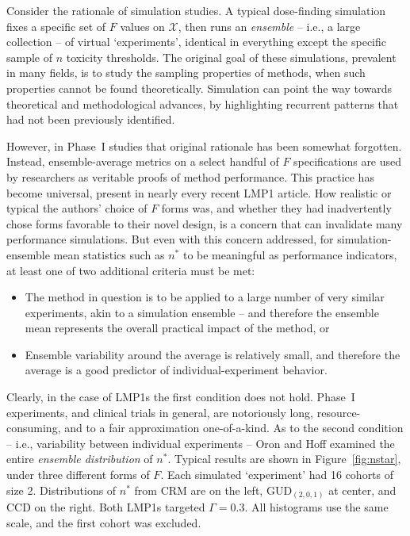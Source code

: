 Consider the rationale of simulation studies. A typical dose-finding simulation fixes a specific set of $F$ values on $\mathcal{X}$, then runs an \emph{ensemble} -- i.e., a large collection -- of virtual `experiments', identical in everything except the specific sample of $n$ toxicity thresholds. The original goal of these simulations, prevalent in many fields, is to study the sampling properties of methods, when such properties cannot be found theoretically. Simulation can point the way towards theoretical and methodological advances, by highlighting recurrent patterns that had not been previously identified.

However, in Phase~I studies that original rationale has been somewhat forgotten. Instead, ensemble-average metrics on a select handful of $F$ specifications are used by researchers as veritable proofs of method performance. This practice has become universal, present in nearly every recent LMP1 article. How realistic or typical the authors' choice of $F$ forms was, and whether they had inadvertently chose forms favorable to their novel design, is a concern that can invalidate many performance simulations. But even with this concern addressed, for simulation-ensemble mean statistics such as $n^*$ to be meaningful as performance indicators, at least one of two additional criteria must be met:
\begin{itemize}
\item The method in question is to be applied to a large number of very similar experiments, akin to a simulation ensemble -- and therefore the ensemble mean represents the overall practical impact of the method, or
\item Ensemble variability around the average is relatively small, and therefore the average is a good predictor of individual-experiment behavior.
\end{itemize}

Clearly, in the case of LMP1s the first condition does not hold. Phase~I experiments, and clinical trials in general, are notoriously long, resource-consuming, and to a fair approximation one-of-a-kind. As to the second condition -- i.e., variability between individual experiments -- Oron and Hoff \citep{Oron:Hoff:smal:2013} examined the entire \emph{ensemble distribution} of $n^*$. Typical results are shown in Figure~\ref{fig:nstar}, under three different forms of $F$. Each simulated `experiment' had 16 cohorts of size 2. Distributions of $n^*$ from CRM are on the left, GUD$_{(2,0,1)}$ at center, and CCD on the right. Both LMP1s targeted $\Gamma=0.3$. All histograms use the same scale, and the first cohort was excluded.


